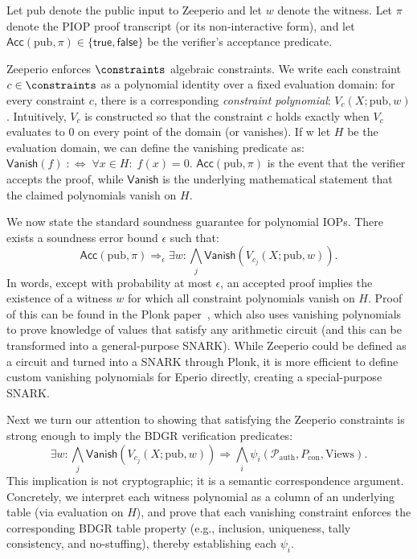 Let $\mathrm{pub}$ denote the public input to Zeeperio and let $w$ denote the witness. Let $\pi$ denote the PIOP proof transcript (or its non-interactive form), and let $\mathsf{Acc}(\mathrm{pub},\pi)\in\{\mathsf{true},\mathsf{false}\}$ be the verifier’s acceptance predicate.

Zeeperio enforces $\constraints$ algebraic constraints. We write each constraint $c\in\constraints$ as a polynomial identity over a fixed evaluation domain: for every constraint $c$, there is a corresponding \emph{constraint polynomial}: $V_{c}(X;\mathrm{pub},w)$. Intuitively, $V_c$ is constructed so that the constraint $c$ holds exactly when $V_c$ evaluates to $0$ on every point of the domain (or vanishes). If w let $H$ be the evaluation domain, we can define the vanishing predicate as: $\mathsf{Vanish}(f)\;:\Leftrightarrow\;\forall x\in H:\; f(x)=0$. $\mathsf{Acc}(\mathrm{pub},\pi)$ is the event that the verifier accepts the proof, while $\mathsf{Vanish}$ is the underlying mathematical statement that the claimed polynomials vanish on $H$.

We now state the standard soundness guarantee for polynomial IOPs. There exists a soundness error bound $\epsilon$ such that:
\[
\mathsf{Acc}(\mathrm{pub},\pi)\Rightarrow_{\epsilon}\exists w:\bigwedge_j \mathsf{Vanish}\!\left(V_{c_j}(X;\mathrm{pub},w)\right).
\]
In words, except with probability at most $\epsilon$, an accepted proof implies the existence of a witness $w$ for which all constraint polynomials vanish on $H$. Proof of this can be found in the Plonk paper~\cite{GWC19}, which also uses vanishing polynomials to prove knowledge of values that satisfy any arithmetic circuit (and this can be transformed into a general-purpose SNARK). While Zeeperio could be defined as a circuit and turned into a SNARK through Plonk, it is more efficient to define custom vanishing polynomials for Eperio directly, creating a special-purpose SNARK.

Next we turn our attention to showing that satisfying the Zeeperio constraints is strong enough to imply the BDGR verification predicates:
\[
\exists w:\bigwedge_j \mathsf{Vanish}\!\left(V_{c_j}(X;\mathrm{pub},w)\right)\Rightarrow \bigwedge_i \psi_i(\mathcal{P}_{\mathrm{auth}},P_{\mathrm{con}},\mathrm{Views}).
\]
This implication is not cryptographic; it is a semantic correspondence argument. Concretely, we interpret each witness polynomial as a column of an underlying table (via evaluation on $H$), and prove that each vanishing constraint enforces the corresponding BDGR table property (e.g., inclusion, uniqueness, tally consistency, and no-stuffing), thereby establishing each $\psi_i$.

